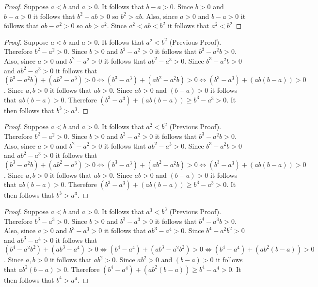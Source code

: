\documentclass[6pt]{article}
\begin{document}
\begin{proof}
    Suppose $a < b$ and $a > 0$.
    It follows that $b - a > 0$.
    Since $b > 0$ and $b - a > 0$ it follows that $b^2 - ab > 0$ so $b^2 > ab$.
    Also, since $a > 0$ and $b - a > 0$ it follows that $ab - a^2 > 0$ so $ab > a^2$.
    Since $a^2 < ab < b^2$ it follows that $a^2 < b^2$
\end{proof}

\begin{proof}
    Suppose $a < b$ and $a > 0$. It follows that $a^2 < b^2$ (Previous Proof).
    Therefore $b^2 - a^2 > 0$.
    Since $b > 0$ and $b^2 - a^2 > 0$ it follows that $b^3 - a^2b > 0$.
    Also, since $a > 0$ and $b^2 - a^2 > 0$ it follows that $ab^2 - a^3 > 0$.
    Since $b^3 - a^2b > 0$ and $ab^2 - a^3 > 0$ it follows that 
        $(b^3 - a^2b) + (ab^2 - a^3) > 0 
        \iff (b^3 - a^3) + (ab^2 - a^2b) > 0
        \iff (b^3 - a^3) + (ab(b - a)) > 0$.
    Since $a, b > 0$ it follows that $ab > 0$.
    Since $ab > 0$ and $(b - a) > 0$ it follows that $ab(b - a) > 0$.
    Therefore $(b^3 - a^3) + (ab(b - a)) \ge b^3 - a^3 > 0$.
    It then follows that $b^3 > a^3$.
\end{proof}

\begin{proof}
    Suppose $a < b$ and $a > 0$. It follows that $a^2 < b^2$ (Previous Proof).
    Therefore $b^2 - a^2 > 0$.
    Since $b > 0$ and $b^2 - a^2 > 0$ it follows that $b^3 - a^2b > 0$.
    Also, since $a > 0$ and $b^2 - a^2 > 0$ it follows that $ab^2 - a^3 > 0$.
    Since $b^3 - a^2b > 0$ and $ab^2 - a^3 > 0$ it follows that 
        $(b^3 - a^2b) + (ab^2 - a^3) > 0 
        \iff (b^3 - a^3) + (ab^2 - a^2b) > 0
        \iff (b^3 - a^3) + (ab(b - a)) > 0$.
    Since $a, b > 0$ it follows that $ab > 0$.
    Since $ab > 0$ and $(b - a) > 0$ it follows that $ab(b - a) > 0$.
    Therefore $(b^3 - a^3) + (ab(b - a)) \ge b^3 - a^3 > 0$.
    It then follows that $b^3 > a^3$.
\end{proof}

\begin{proof}
    Suppose $a < b$ and $a > 0$. It follows that $a^3 < b^3$ (Previous Proof).  
    Therefore $b^3 - a^3 > 0$.  
    Since $b > 0$ and $b^3 - a^3 > 0$ it follows that $b^4 - a^3b > 0$.  
    Also, since $a > 0$ and $b^3 - a^3 > 0$ it follows that $ab^3 - a^4 > 0$.  
    Since $b^4 - a^2b^2 > 0$ and $ab^3 - a^4 > 0$ it follows that  
        $(b^4 - a^2b^2) + (ab^3 - a^4) > 0  
        \iff (b^4 - a^4) + (ab^3 - a^2b^2) > 0  
        \iff (b^4 - a^4) + (ab^2(b - a)) > 0$.  
    Since $a, b > 0$ it follows that $ab^2 > 0$.  
    Since $ab^2 > 0$ and $(b - a) > 0$ it follows that $ab^2(b - a) > 0$.  
    Therefore $(b^4 - a^4) + (ab^2(b - a)) \ge b^4 - a^4 > 0$.  
    It then follows that $b^4 > a^4$.
\end{proof}
\end{document}
